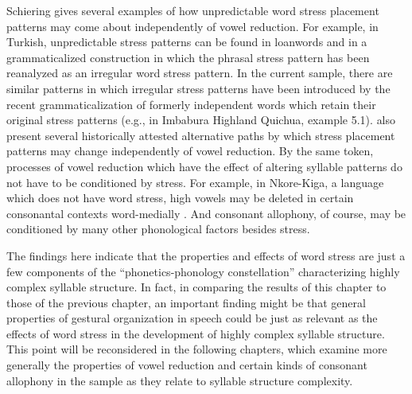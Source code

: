   Schiering gives several examples of how unpredictable word stress placement patterns may come about independently of vowel reduction. For example, in Turkish, unpredictable stress patterns can be found in loanwords and in a grammaticalized construction in which the phrasal stress pattern has been reanalyzed as an irregular word stress pattern. In the current sample, there are similar patterns in which irregular stress patterns have been introduced by the recent grammaticalization of formerly independent words which retain their original stress patterns (e.g., in Imbabura Highland Quichua, example 5.1). \citet{BybeeEtAl1998} also present several historically attested alternative paths by which stress placement patterns may change independently of vowel reduction. By the same token, processes of vowel reduction which have the effect of altering syllable patterns do not have to be conditioned by stress. For example, in Nkore-Kiga, a language which does not have word stress, high vowels may be deleted in certain consonantal contexts word-medially \citep[202-5]{Taylor1985}. And consonant allophony, of course, may be conditioned by many other phonological factors besides stress.

  The findings here indicate that the properties and effects of word stress are just a few components of the “phonetics-phonology constellation” \citep[354]{Schiering2007} characterizing highly complex syllable structure. In fact, in comparing the results of this chapter to those of the previous chapter, an important finding might be that general properties of gestural organization in speech could be just as relevant as the effects of word stress in the development of highly complex syllable structure. This point will be reconsidered in the following chapters, which examine more generally the properties of vowel reduction and certain kinds of consonant allophony in the sample as they relate to syllable structure complexity.

